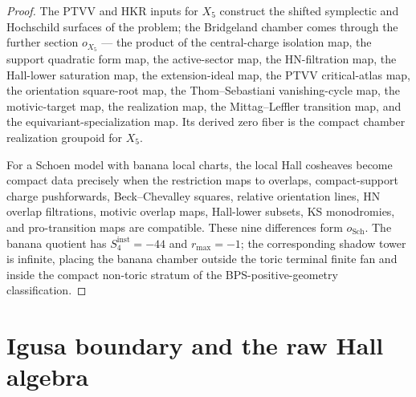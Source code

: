 \begin{proof}
The PTVV and HKR inputs for \(X_5\) construct the shifted symplectic
and Hochschild surfaces of the problem; the Bridgeland chamber comes
through the further section \(o_{X_5}\) — the product of the
central-charge isolation map, the support quadratic form map, the
active-sector map, the HN-filtration map, the Hall-lower saturation
map, the extension-ideal map, the PTVV critical-atlas map, the
orientation square-root map, the Thom--Sebastiani vanishing-cycle
map, the motivic-target map, the realization map, the
Mittag--Leffler transition map, and the equivariant-specialization
map. Its derived zero fiber is the compact chamber realization
groupoid for \(X_5\).

For a Schoen model with banana local charts, the local Hall cosheaves
become compact data precisely when the restriction maps to overlaps,
compact-support charge pushforwards, Beck--Chevalley squares, relative
orientation lines, HN overlap filtrations, motivic overlap maps,
Hall-lower subsets, KS monodromies, and pro-transition maps are
compatible. These nine differences form \(o_{\mathrm{Sch}}\). The banana quotient has $S_4^{\mathrm{inst}} = -44$ and $r_{\max} = -1$;
the corresponding shadow tower is infinite, placing the banana
chamber outside the toric terminal finite fan and inside the compact
non-toric stratum of the BPS-positive-geometry classification.
\end{proof}

\section{Igusa boundary and the raw Hall algebra}

